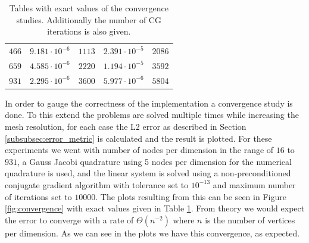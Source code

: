 \begin{table}
\begin{subtable}{\textwidth}
\begin{small}
\begin{tabular}{ccc@{\hskip 1cm}cc}
                \(466\)   &  \(9.181\cdot 10^{-6}\)  & \(1113\)  &  \(2.391\cdot 10^{-5}\) & \(2086\) \\
                \(659\)   &  \(4.585\cdot 10^{-6}\)  & \(2220\)  &  \(1.194\cdot 10^{-5}\) & \(3592\) \\
                \(931\)   &  \(2.295\cdot 10^{-6}\)  & \(3600\)  &  \(5.977\cdot 10^{-6}\) & \(5804\) \\
                \bottomrule
            \end{tabular}
        \end{small}
    \end{subtable}
    \caption{Tables with exact values of the convergence studies. Additionally the number of CG iterations is also given.}
    \label{tab:convergence}
\end{table}
In order to gauge the correctness of the implementation a convergence study is done. To this extend the problems are solved multiple times while increasing the mesh resolution, for each case the L2 error as described in Section \ref{subsubsec:error_metric} is calculated and the result is plotted. For these experiments we went with number of nodes per dimension in the range of \(16\) to \(931\), a Gauss Jacobi quadrature using 5 nodes per dimension for the numerical quadrature is used, and the linear system is solved using a non-preconditioned conjugate gradient algorithm with tolerance set to \(10^{-13}\) and maximum number of iterations set to \(10000\). The plots resulting from this can be seen in Figure \ref{fig:convergence} with exact values given in Table \ref{tab:convergence}. From theory we would expect the error to converge with a rate of $\Theta(n^{-2})$ where $n$ is the number of vertices per dimension. As we can see in the plots we have this convergence, as expected.\medskip


